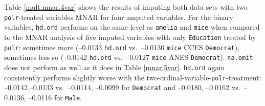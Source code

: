 \documentclass[12pt,econ]{sources/authesis}
\begin{document}
Table \ref{mult.mnar.4var} shows the results of imputing both data sets with two \texttt{polr}-treated variables MNAR for four amputed variables. For the binary variables, \texttt{hd.ord} performs on the same level as \texttt{amelia} and \texttt{mice} when compared to the MNAR analysis of five imputed variables with only \texttt{Education} treated by \texttt{polr}; sometimes more (--0.0133 \texttt{hd.ord} vs.~--0.0130 \texttt{mice} CCES \texttt{Democrat}), sometimes less so (--0.0142 \texttt{hd.ord} vs.~--0.0127 \texttt{mice} ANES \texttt{Democrat}). \texttt{na.omit} does not perform as well as it does in Table \ref{mnar.5var}. \texttt{hd.ord} again consistently performs slightly worse with the two-ordinal-variable-\texttt{polr}-treatment: --0.0142,--0.0133 vs.~--0.0114, --0.0099 for \texttt{Democrat} and --0.0180, --0.0162 vs.~--0.0136, --0.0116 for \texttt{Male}.
\end{document}
